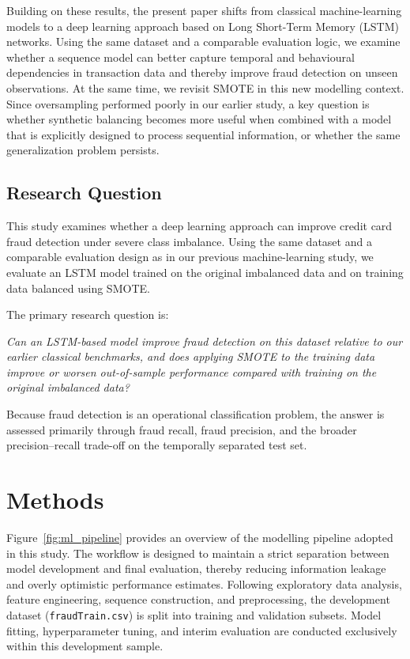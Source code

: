 \documentclass[oneside,12pt,parskip=half,american,numbers=noenddot]{scrreprt}
\begin{document}
Building on these results, the present paper shifts from classical machine-learning models to a deep learning approach based on Long Short-Term Memory (LSTM) networks. Using the same dataset and a comparable evaluation logic, we examine whether a sequence model can better capture temporal and behavioural dependencies in transaction data and thereby improve fraud detection on unseen observations. At the same time, we revisit SMOTE in this new modelling context. Since oversampling performed poorly in our earlier study, a key question is whether synthetic balancing becomes more useful when combined with a model that is explicitly designed to process sequential information, or whether the same generalization problem persists.

\section{Research Question}\label{Research Question}
This study examines whether a deep learning approach can improve credit card fraud detection under severe class imbalance. Using the same dataset and a comparable evaluation design as in our previous machine-learning study, we evaluate an LSTM model trained on the original imbalanced data and on training data balanced using SMOTE.

The primary research question is:

\textit{Can an LSTM-based model improve fraud detection on this dataset relative to our earlier classical benchmarks, and does applying SMOTE to the training data improve or worsen out-of-sample performance compared with training on the original imbalanced data?}

Because fraud detection is an operational classification problem, the answer is assessed primarily through fraud recall, fraud precision, and the broader precision--recall trade-off on the temporally separated test set.

\pagebreak
\chapter{Methods}

Figure~\ref{fig:ml_pipeline} provides an overview of the modelling pipeline adopted in this study. The workflow is designed to maintain a strict separation between model development and final evaluation, thereby reducing information leakage and overly optimistic performance estimates. Following exploratory data analysis, feature engineering, sequence construction, and preprocessing, the development dataset (\texttt{fraudTrain.csv}) is split into training and validation subsets. Model fitting, hyperparameter tuning, and interim evaluation are conducted exclusively within this development sample.
\end{document}
